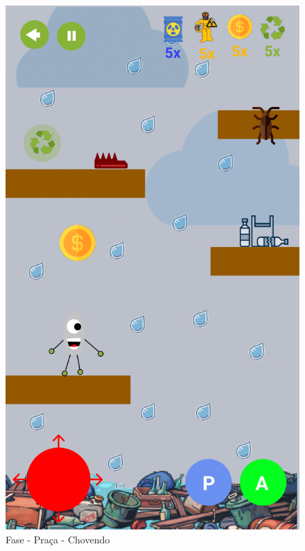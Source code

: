 \documentclass[]{scrartcl}
\begin{document}
\begin{figure}[H]
	\begin{center}
		\includegraphics[scale=0.3]{figs/Game Design-10.png}
		\caption{Fase - Praça - Chovendo}
	\end{center}
\end{figure}
\end{document}
